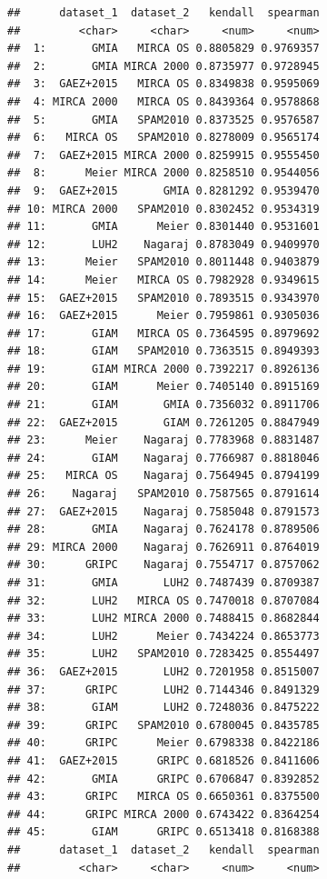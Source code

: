 \documentclass[
  11pt,
]{article}
\begin{document}
\begin{verbatim}
##      dataset_1  dataset_2   kendall  spearman
##         <char>     <char>     <num>     <num>
##  1:       GMIA   MIRCA OS 0.8805829 0.9769357
##  2:       GMIA MIRCA 2000 0.8735977 0.9728945
##  3:  GAEZ+2015   MIRCA OS 0.8349838 0.9595069
##  4: MIRCA 2000   MIRCA OS 0.8439364 0.9578868
##  5:       GMIA   SPAM2010 0.8373525 0.9576587
##  6:   MIRCA OS   SPAM2010 0.8278009 0.9565174
##  7:  GAEZ+2015 MIRCA 2000 0.8259915 0.9555450
##  8:      Meier MIRCA 2000 0.8258510 0.9544056
##  9:  GAEZ+2015       GMIA 0.8281292 0.9539470
## 10: MIRCA 2000   SPAM2010 0.8302452 0.9534319
## 11:       GMIA      Meier 0.8301440 0.9531601
## 12:       LUH2    Nagaraj 0.8783049 0.9409970
## 13:      Meier   SPAM2010 0.8011448 0.9403879
## 14:      Meier   MIRCA OS 0.7982928 0.9349615
## 15:  GAEZ+2015   SPAM2010 0.7893515 0.9343970
## 16:  GAEZ+2015      Meier 0.7959861 0.9305036
## 17:       GIAM   MIRCA OS 0.7364595 0.8979692
## 18:       GIAM   SPAM2010 0.7363515 0.8949393
## 19:       GIAM MIRCA 2000 0.7392217 0.8926136
## 20:       GIAM      Meier 0.7405140 0.8915169
## 21:       GIAM       GMIA 0.7356032 0.8911706
## 22:  GAEZ+2015       GIAM 0.7261205 0.8847949
## 23:      Meier    Nagaraj 0.7783968 0.8831487
## 24:       GIAM    Nagaraj 0.7766987 0.8818046
## 25:   MIRCA OS    Nagaraj 0.7564945 0.8794199
## 26:    Nagaraj   SPAM2010 0.7587565 0.8791614
## 27:  GAEZ+2015    Nagaraj 0.7585048 0.8791573
## 28:       GMIA    Nagaraj 0.7624178 0.8789506
## 29: MIRCA 2000    Nagaraj 0.7626911 0.8764019
## 30:      GRIPC    Nagaraj 0.7554717 0.8757062
## 31:       GMIA       LUH2 0.7487439 0.8709387
## 32:       LUH2   MIRCA OS 0.7470018 0.8707084
## 33:       LUH2 MIRCA 2000 0.7488415 0.8682844
## 34:       LUH2      Meier 0.7434224 0.8653773
## 35:       LUH2   SPAM2010 0.7283425 0.8554497
## 36:  GAEZ+2015       LUH2 0.7201958 0.8515007
## 37:      GRIPC       LUH2 0.7144346 0.8491329
## 38:       GIAM       LUH2 0.7248036 0.8475222
## 39:      GRIPC   SPAM2010 0.6780045 0.8435785
## 40:      GRIPC      Meier 0.6798338 0.8422186
## 41:  GAEZ+2015      GRIPC 0.6818526 0.8411606
## 42:       GMIA      GRIPC 0.6706847 0.8392852
## 43:      GRIPC   MIRCA OS 0.6650361 0.8375500
## 44:      GRIPC MIRCA 2000 0.6743422 0.8364254
## 45:       GIAM      GRIPC 0.6513418 0.8168388
##      dataset_1  dataset_2   kendall  spearman
##         <char>     <char>     <num>     <num>
\end{verbatim}
\end{document}
